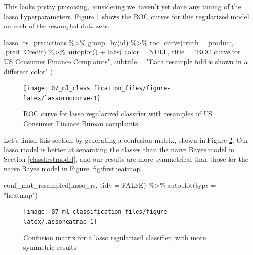\documentclass[
]{krantz}
\makeatletter
\newenvironment{Shaded}{\begin{snugshade}}{\end{snugshade}}
\newcommand{\AttributeTok}[1]{\textcolor[rgb]{0.77,0.63,0.00}{#1}}
\newcommand{\ConstantTok}[1]{\textcolor[rgb]{0.00,0.00,0.00}{#1}}
\newcommand{\FunctionTok}[1]{\textcolor[rgb]{0.00,0.00,0.00}{#1}}
\newcommand{\NormalTok}[1]{#1}
\newcommand{\SpecialCharTok}[1]{\textcolor[rgb]{0.00,0.00,0.00}{#1}}
\newcommand{\StringTok}[1]{\textcolor[rgb]{0.31,0.60,0.02}{#1}}
\newenvironment{kframe}{%
\medskip{}
\setlength{\fboxsep}{.8em}
 \def\at@end@of@kframe{}%
 \ifinner\ifhmode%
  \def\at@end@of@kframe{\end{minipage}}%
  \begin{minipage}{\columnwidth}%
 \fi\fi%
 \def\FrameCommand##1{\hskip\@totalleftmargin \hskip-\fboxsep
 \colorbox{shadecolor}{##1}\hskip-\fboxsep
     \hskip-\linewidth \hskip-\@totalleftmargin \hskip\columnwidth}%
 \MakeFramed {\advance\hsize-\width
   \@totalleftmargin\z@ \linewidth\hsize
   \@setminipage}}%
 {\par\unskip\endMakeFramed%
 \at@end@of@kframe}
\renewenvironment{Shaded}{\begin{kframe}}{\end{kframe}}
\makeatother
\begin{document}
This looks pretty promising, considering we haven't yet done any tuning of the lasso hyperparameters.
Figure \ref{fig:lassoroccurve} shows the ROC curves for this regularized model on each of the resampled data sets.

\begin{Shaded}
\begin{Highlighting}[]
\NormalTok{lasso\_rs\_predictions }\SpecialCharTok{\%\textgreater{}\%}
  \FunctionTok{group\_by}\NormalTok{(id) }\SpecialCharTok{\%\textgreater{}\%}
  \FunctionTok{roc\_curve}\NormalTok{(}\AttributeTok{truth =}\NormalTok{ product, .pred\_Credit) }\SpecialCharTok{\%\textgreater{}\%}
  \FunctionTok{autoplot}\NormalTok{() }\SpecialCharTok{+}
  \FunctionTok{labs}\NormalTok{(}
    \AttributeTok{color =} \ConstantTok{NULL}\NormalTok{,}
    \AttributeTok{title =} \StringTok{"ROC curve for US Consumer Finance Complaints"}\NormalTok{,}
    \AttributeTok{subtitle =} \StringTok{"Each resample fold is shown in a different color"}
\NormalTok{  )}
\end{Highlighting}
\end{Shaded}

\begin{figure}

{\centering \texttt{[image: 07\_ml\_classification\_files/figure-latex/lassoroccurve-1]} 

}

\caption{ROC curve for lasso regularized classifier with resamples of US Consumer Finance Bureau complaints}\label{fig:lassoroccurve}
\end{figure}

Let's finish this section by generating a confusion matrix, shown in Figure \ref{fig:lassoheatmap}.
Our lasso model is better at separating the classes than the naive Bayes model in Section \ref{classfirstmodel}, and our results are more symmetrical than those for the naive Bayes model in Figure \ref{fig:firstheatmap}.

\begin{Shaded}
\begin{Highlighting}[]
\FunctionTok{conf\_mat\_resampled}\NormalTok{(lasso\_rs, }\AttributeTok{tidy =} \ConstantTok{FALSE}\NormalTok{) }\SpecialCharTok{\%\textgreater{}\%}
  \FunctionTok{autoplot}\NormalTok{(}\AttributeTok{type =} \StringTok{"heatmap"}\NormalTok{)}
\end{Highlighting}
\end{Shaded}

\begin{figure}

{\centering \texttt{[image: 07\_ml\_classification\_files/figure-latex/lassoheatmap-1]} 

}

\caption{Confusion matrix for a lasso regularized classifier, with more symmetric results}\label{fig:lassoheatmap}
\end{figure}
\end{document}
